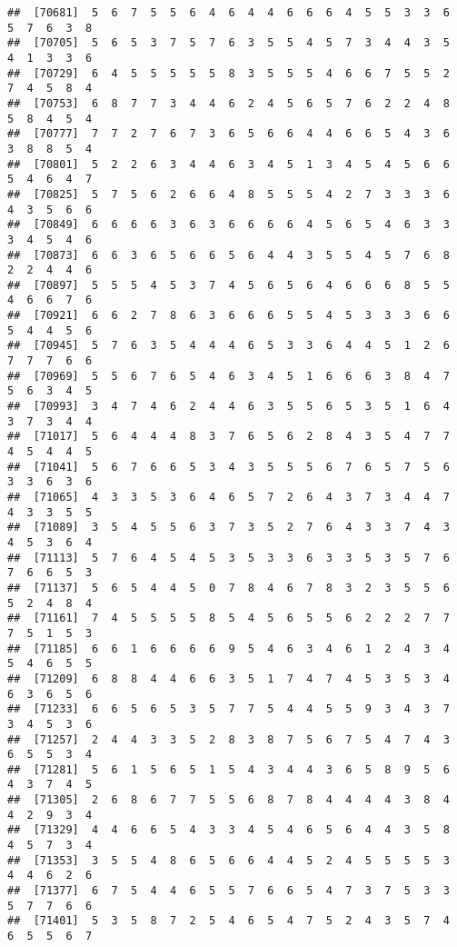 \documentclass[
]{book}
\begin{document}
\begin{verbatim}
##  [70681]  5  6  7  5  5  6  4  6  4  4  6  6  6  4  5  5  3  3  6  5  7  6  3  8
##  [70705]  5  6  5  3  7  5  7  6  3  5  5  4  5  7  3  4  4  3  5  4  1  3  3  6
##  [70729]  6  4  5  5  5  5  5  8  3  5  5  5  4  6  6  7  5  5  2  7  4  5  8  4
##  [70753]  6  8  7  7  3  4  4  6  2  4  5  6  5  7  6  2  2  4  8  5  8  4  5  4
##  [70777]  7  7  2  7  6  7  3  6  5  6  6  4  4  6  6  5  4  3  6  3  8  8  5  4
##  [70801]  5  2  2  6  3  4  4  6  3  4  5  1  3  4  5  4  5  6  6  5  4  6  4  7
##  [70825]  5  7  5  6  2  6  6  4  8  5  5  5  4  2  7  3  3  3  6  4  3  5  6  6
##  [70849]  6  6  6  6  3  6  3  6  6  6  6  4  5  6  5  4  6  3  3  3  4  5  4  6
##  [70873]  6  6  3  6  5  6  6  5  6  4  4  3  5  5  4  5  7  6  8  2  2  4  4  6
##  [70897]  5  5  5  4  5  3  7  4  5  6  5  6  4  6  6  6  8  5  5  4  6  6  7  6
##  [70921]  6  6  2  7  8  6  3  6  6  6  5  5  4  5  3  3  3  6  6  5  4  4  5  6
##  [70945]  5  7  6  3  5  4  4  4  6  5  3  3  6  4  4  5  1  2  6  7  7  7  6  6
##  [70969]  5  5  6  7  6  5  4  6  3  4  5  1  6  6  6  3  8  4  7  5  6  3  4  5
##  [70993]  3  4  7  4  6  2  4  4  6  3  5  5  6  5  3  5  1  6  4  3  7  3  4  4
##  [71017]  5  6  4  4  4  8  3  7  6  5  6  2  8  4  3  5  4  7  7  4  5  4  4  5
##  [71041]  5  6  7  6  6  5  3  4  3  5  5  5  6  7  6  5  7  5  6  3  3  6  3  6
##  [71065]  4  3  3  5  3  6  4  6  5  7  2  6  4  3  7  3  4  4  7  4  3  3  5  5
##  [71089]  3  5  4  5  5  6  3  7  3  5  2  7  6  4  3  3  7  4  3  4  5  3  6  4
##  [71113]  5  7  6  4  5  4  5  3  5  3  3  6  3  3  5  3  5  7  6  7  6  6  5  3
##  [71137]  5  6  5  4  4  5  0  7  8  4  6  7  8  3  2  3  5  5  6  5  2  4  8  4
##  [71161]  7  4  5  5  5  5  8  5  4  5  6  5  5  6  2  2  2  7  7  7  5  1  5  3
##  [71185]  6  6  1  6  6  6  6  9  5  4  6  3  4  6  1  2  4  3  4  5  4  6  5  5
##  [71209]  6  8  8  4  4  6  6  3  5  1  7  4  7  4  5  3  5  3  4  6  3  6  5  6
##  [71233]  6  6  5  6  5  3  5  7  7  5  4  4  5  5  9  3  4  3  7  3  4  5  3  6
##  [71257]  2  4  4  3  3  5  2  8  3  8  7  5  6  7  5  4  7  4  3  6  5  5  3  4
##  [71281]  5  6  1  5  6  5  1  5  4  3  4  4  3  6  5  8  9  5  6  4  3  7  4  5
##  [71305]  2  6  8  6  7  7  5  5  6  8  7  8  4  4  4  4  3  8  4  4  2  9  3  4
##  [71329]  4  4  6  6  5  4  3  3  4  5  4  6  5  6  4  4  3  5  8  4  5  7  3  4
##  [71353]  3  5  5  4  8  6  5  6  6  4  4  5  2  4  5  5  5  5  3  4  4  6  2  6
##  [71377]  6  7  5  4  4  6  5  5  7  6  6  5  4  7  3  7  5  3  3  5  7  7  6  6
##  [71401]  5  3  5  8  7  2  5  4  6  5  4  7  5  2  4  3  5  7  4  6  5  5  6  7

\end{verbatim}
\end{document}
